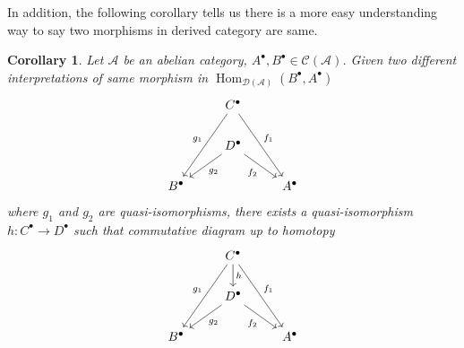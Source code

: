 \documentclass{ctexart}
\newtheorem{corollary}{Corollary}[section]
\renewcommand{\hom}{\operatorname{Hom}}
\begin{document}
In addition, the following corollary tells us there is a more easy understanding way to say two morphisms in derived category are same.
\begin{corollary}
    Let $\mathscr{A}$ be an abelian category, $A^{\bullet},B^{\bullet}\in \mathcal{C}(\mathscr{A})$.
    Given two different interpretations of same morphism in $\hom_{\mathcal{D}(\mathscr{A})}(B^{\bullet}, A^{\bullet})$
    \begin{equation}
        \begin{tikzcd}
            & C^{\bullet} \arrow[ddr, "f_{1}"] \arrow[ddl, "g_{1}" swap] & \\
            & D^{\bullet} \arrow[dr, "f_{2}" swap] \arrow[dl, "g_{2}"] & \\
            B^{\bullet} &&
            A^{\bullet}
        \end{tikzcd}
    \end{equation}
    where $g_{1}$ and $g_{2}$ are quasi-isomorphisms,
    there exists a quasi-isomorphism $h: C^{\bullet} \rightarrow D^{\bullet}$ such that commutative diagram up to homotopy
    \begin{equation}
        \begin{tikzcd}
            & C^{\bullet} \arrow[ddr, "f_{1}"] \arrow[d, "h"] \arrow[ddl, "g_{1}" swap] & \\
            & D^{\bullet} \arrow[dr, "f_{2}" swap] \arrow[dl, "g_{2}"] & \\
            B^{\bullet} &&
            A^{\bullet}
        \end{tikzcd}
    \end{equation}
    \vspace{-\baselineskip} %
    \label{Corollary 6.1}
\end{corollary}
\end{document}
